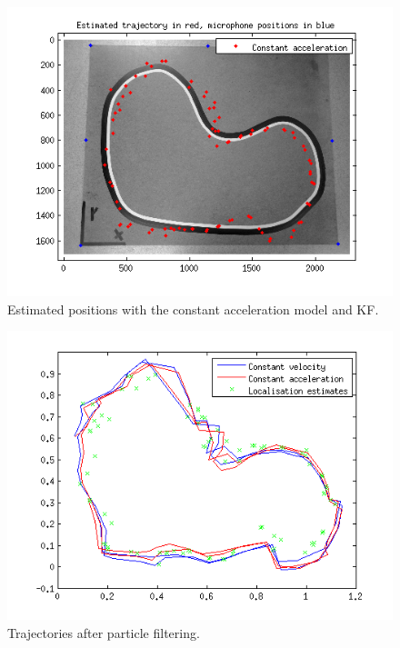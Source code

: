 \documentclass[10pt,a4paper]{report}
\begin{document}
\begin{figure}[H]
\begin{center}
  \includegraphics[width = 350pt]{kf_CA.png}
  \caption{Estimated positions with the constant acceleration model and KF.}
  \label{kf_CA}
  \end{center}
\end{figure}
\begin{figure}[H]
\begin{center}
  \includegraphics[width = 350pt]{pf_all.png}
  \caption{Trajectories after particle filtering.}
  \label{pf_all}
  \end{center}
\end{figure}
\end{document}
